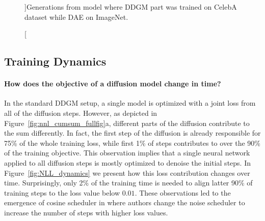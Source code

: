 \begin{figure}[htbp!]
	\centering
		\caption[][\baselineskip]{Generations from \ours{} model where DDGM part was trained on CelebA dataset while DAE on ImageNet.}
	\label{fig:celeba_gen_im} 
\vspace*{\baselineskip}
\end{figure}

\newpage
\subsection{Training Dynamics}\label{appx:train_curve}

\paragraph{How does the objective of a diffusion model change in time?}
In the standard DDGM setup, a single model is optimized with a joint loss from all of the diffusion steps. However, as depicted in Figure~\ref{fig:nnl_cumsum_fullfig}a, different parts of the diffusion contribute to the sum differently. In fact, the first step of the diffusion is already responsible for 75\% of the whole training loss, while first 1\% of steps contributes to over the 90\% of the training objective. This observation implies that a single neural network applied to all diffusion steps %
is mostly optimized to denoise the initial steps. 
In Figure~\ref{fig:NLL_dynamics} we present how this loss contribution changes over time. Surprisingly, only 2\% of the training time is needed to align latter 90\% of training steps to the loss value below $0.01$. These observations led to the emergence of cosine scheduler in \citet{nichol2021improved} where authors change the noise scheduler to increase the number of steps with higher loss values.

